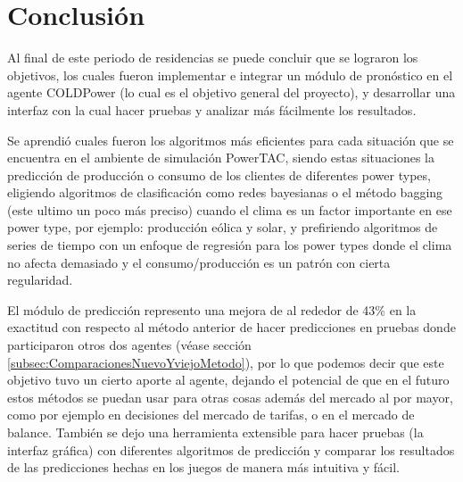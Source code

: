 \chapter{Conclusión}

Al final de este periodo de residencias se puede concluir que se lograron los objetivos, los cuales fueron implementar e integrar un módulo de pronóstico en el agente COLDPower (lo cual es el objetivo general del proyecto), y desarrollar una interfaz con la cual hacer pruebas y analizar más fácilmente los resultados. 

Se aprendió cuales fueron los algoritmos más eficientes para cada situación que se encuentra en el ambiente de simulación PowerTAC, siendo estas situaciones la predicción de producción o consumo de los clientes de diferentes power types,
eligiendo algoritmos de clasificación como redes bayesianas o el método bagging (este ultimo un poco más preciso) cuando el clima es un factor importante en ese power type, por ejemplo: producción eólica y solar, y prefiriendo algoritmos de series de tiempo con un enfoque de regresión para los power types donde el clima no afecta demasiado y el consumo/producción es un patrón con cierta regularidad.

El módulo de predicción represento una mejora de al rededor de 43\% en la exactitud con respecto al método anterior de hacer predicciones en pruebas donde participaron otros dos agentes (véase sección \ref{subsec:ComparacionesNuevoYviejoMetodo}), por lo que podemos decir que este objetivo tuvo un cierto aporte al agente, dejando el potencial de que en el futuro estos métodos se puedan usar para otras cosas además del mercado al por mayor, como por ejemplo en decisiones del mercado de tarifas, o en el mercado de balance. También se dejo una herramienta extensible para hacer pruebas (la interfaz gráfica) con diferentes algoritmos de predicción y comparar los resultados de las predicciones hechas en los juegos de manera más intuitiva y fácil.